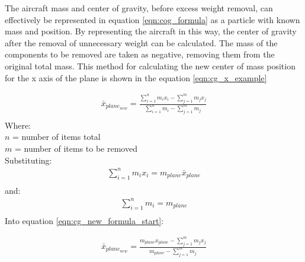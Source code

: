 The aircraft mass and center of gravity, before excess weight removal, can effectively be represented in equation \ref{eqn:cog_formula} as a particle with known mass and position.
By representing the aircraft in this way, the center of gravity after the removal of unnecessary weight can be calculated.
The mass of the components to be removed are taken as negative, removing them from the original total mass.
This method for calculating the new center of mass position for the x axis of the plane is shown in the equation \ref{eqn:cg_x_example}


\begin{equation}
\begin{split}
  \bar{x}_{plane_{new}} = \frac{ \sum_{i=1}^{n}{m_{i} x_{i}} - \sum_{j=1}^{m}{m_{j} x_{j}}}{ \sum_{i=1}^{n}{m_{i}} - \sum_{j=1}^{m}{m_{j}}} \\
\end{split}
\label{eqn:cg_new_formula_start}
\end{equation}
Where: \\
$n$ = number of items total \\
$m$ = number of items to be removed \\

Substituting:
\begin{equation}
\begin{split}
  \sum_{i=1}^{n}{m_{i} x_{i}} = m_{plane} \bar{x}_{plane} \\
\end{split}
\label{eqn:m_plane_x_plane_formula}
\end{equation}
and:
\begin{equation}
\begin{split}
  \sum_{i=1}^{n}{m_{i}} = m_{plane} \\
\end{split}
\label{eqn:m_plane_formula}
\end{equation}
Into equation \ref{eqn:cg_new_formula_start}:

\begin{equation}
\begin{split}
  \bar{x}_{plane_{new}} = \frac{ m_{plane} x_{plane} - \sum_{j=1}^{m}{m_{j} x_{j}}}{ m_{plane} - \sum_{j=1}^{m}{m_{j}}} \\
\end{split}
\label{eqn:cg_new_formula_end}
\end{equation}


